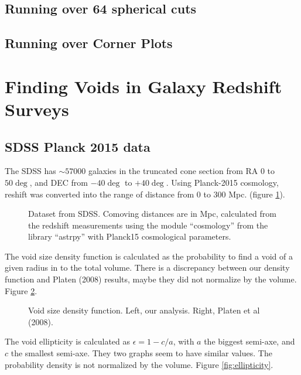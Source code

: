 \documentclass[preprint]{aastex62}
\begin{document}
\subsection{Running over 64 spherical cuts}

\subsection{Running over Corner Plots}







\section{Finding Voids in Galaxy Redshift Surveys}


\subsection{SDSS Planck 2015 data}

The SDSS has $\sim 57000$ galaxies in the truncated cone section from RA 0 to $50\deg$,
and DEC from $-40\deg$ to $+40\deg$. Using Planck-2015 cosmology, reshift was converted into the
range of distance from 0 to 300 Mpc. (figure \ref{fig:Planck15_cat}).
\begin{figure}
  \caption{Dataset from SDSS. Comoving distances are in Mpc, calculated from the redshift
    measurements using the module ``cosmology'' from the library ``astrpy'' with Planck15
    cosmological parameters.
    \label{fig:Planck15_cat}}
\end{figure}

The void size density function is calculated as the probability to find a void
of a given radius in to the total volume. There is a discrepancy between our density function
and Platen (2008) results, maybe they did not normalize by the volume.
Figure \ref{fig:size_density_function}.

\begin{figure}
  \caption{Void size density function. Left, our analysis. Right, Platen et al (2008).
    \label{fig:size_density_function}}
\end{figure}

The void ellipticity is calculated as $\epsilon = 1 - c/a$, with $a$ the biggest semi-axe, and
$c$ the smallest semi-axe. They two graphs seem to have similar values. The probability density
is not normalized by the volume. Figure \ref{fig:ellipticity}.
\end{document}
